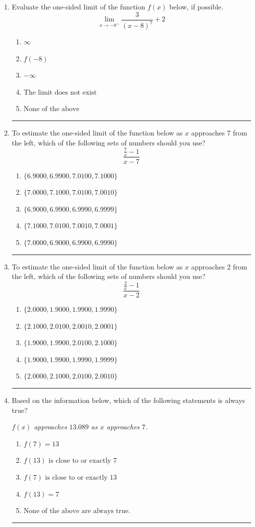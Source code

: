 \documentclass[14pt]{extbook}
\newcommand{\litem}[1]{\item#1\hspace*{-1cm}\rule{\textwidth}{0.4pt}}
\begin{document}
\begin{enumerate}
{\begin{enumerate}[label=\Alph*.]
\end{enumerate} }
\litem{
Evaluate the one-sided limit of the function $f(x)$ below, if possible.\[ \lim_{x \rightarrow -8^+} \frac{3}{(x-8)^7}+2 \]\begin{enumerate}[label=\Alph*.]
\item \( \infty \)
\item \( f(-8) \)
\item \( -\infty \)
\item \( \text{The limit does not exist} \)
\item \( \text{None of the above} \)

\end{enumerate} }
\litem{
To estimate the one-sided limit of the function below as $x$ approaches 7 from the left, which of the following sets of numbers should you use?\[ \frac{\frac{7}{x} - 1}{x - 7} \]\begin{enumerate}[label=\Alph*.]
\item \( \{ 6.9000, 6.9900, 7.0100, 7.1000 \} \)
\item \( \{ 7.0000, 7.1000, 7.0100, 7.0010 \} \)
\item \( \{ 6.9000, 6.9900, 6.9990, 6.9999 \} \)
\item \( \{ 7.1000, 7.0100, 7.0010, 7.0001 \} \)
\item \( \{ 7.0000, 6.9000, 6.9900, 6.9990 \} \)

\end{enumerate} }
\litem{
To estimate the one-sided limit of the function below as $x$ approaches 2 from the left, which of the following sets of numbers should you use?\[ \frac{\frac{2}{x} - 1}{x - 2} \]\begin{enumerate}[label=\Alph*.]
\item \( \{ 2.0000, 1.9000, 1.9900, 1.9990 \} \)
\item \( \{ 2.1000, 2.0100, 2.0010, 2.0001 \} \)
\item \( \{ 1.9000, 1.9900, 2.0100, 2.1000 \} \)
\item \( \{ 1.9000, 1.9900, 1.9990, 1.9999 \} \)
\item \( \{ 2.0000, 2.1000, 2.0100, 2.0010 \} \)

\end{enumerate} }
\litem{
Based on the information below, which of the following statements is always true?
\begin{center}
    \textit{ $f(x)$ approaches $13.089$ as $x$ approaches $7$. }
\end{center}
\begin{enumerate}[label=\Alph*.]
\item \( f(7) = 13 \)
\item \( f(13) \text{ is close to or exactly } 7 \)
\item \( f(7) \text{ is close to or exactly } 13 \)
\item \( f(13) = 7 \)
\item \( \text{None of the above are always true.} \)


\end{enumerate}}
\end{enumerate}
\end{document}
